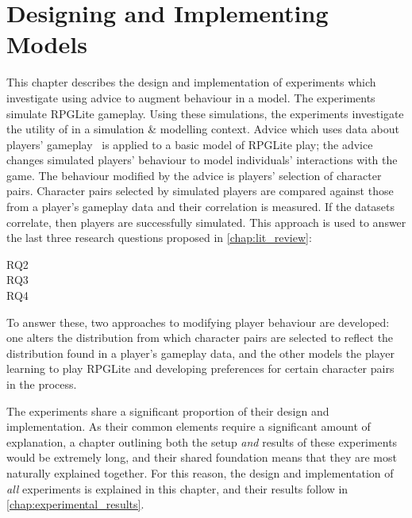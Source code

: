 \chapter{Designing and Implementing \AspectOriented{} Models}
\label{chap:exp1_simulation_optimisation}
\label{chap:experiment_setup}


This chapter describes the design and implementation of experiments which
investigate using advice to augment behaviour in a model. The experiments
simulate RPGLite gameplay. Using these simulations, the experiments investigate
the utility of \aop{} in a simulation \& modelling context. Advice which uses
data about players' gameplay~\cite{rpglite_dataset} is applied to a basic model
of RPGLite play; the advice changes simulated players' behaviour to model
individuals' interactions with the game. 
The behaviour modified by the advice is players' selection of character pairs.
Character pairs selected by simulated players are compared against those from a
player's gameplay data and their correlation is measured. If the datasets
correlate, then players are successfully simulated. 
This approach is used to answer the last three research questions proposed in \cref{chap:lit_review}: 

\begin{researchquestion}
  \begin{description}
   \item[RQ2] \rqtwo{}
   \item[RQ3] \rqthree{}
   \item[RQ4] \rqfour{}
  \end{description}
\end{researchquestion}



To answer these, two approaches to modifying player behaviour are developed:
one alters the distribution from which character pairs are selected to reflect
the distribution found in a player's gameplay data, 
and the other models the player learning to play RPGLite and developing
preferences for certain character pairs in the process.

The experiments share a significant proportion of their design and
implementation. As their common elements require a significant amount of
explanation, a chapter outlining both the setup \emph{and} results of these
experiments would be extremely long, and their shared foundation means that they
are most naturally explained together. For this reason, the design and
implementation of \emph{all} experiments is explained in this chapter, and their
results follow in \cref{chap:experimental_results}.

